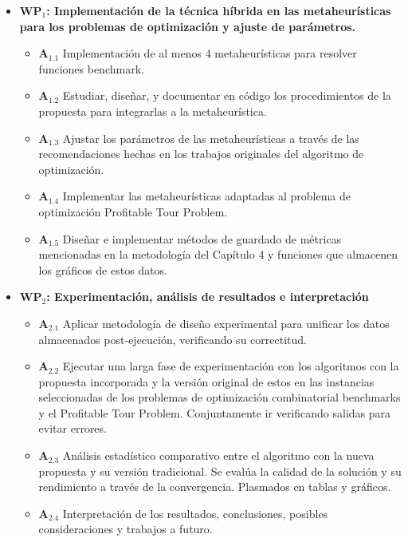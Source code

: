 \begin{itemize}

    \item \textbf{WP$_1$: Implementación de la técnica híbrida en las metaheurísticas para los problemas de optimización y ajuste de parámetros.}

    \begin{itemize}

        \item \textbf{A$_{1.1}$} Implementación de al menos 4 metaheurísticas para resolver funciones benchmark.

        \item \textbf{A$_{1.2}$} Estudiar, diseñar, y documentar en código los procedimientos de la propuesta para integrarlas a la metaheurística.

        \item \textbf{A$_{1.3}$} Ajustar los parámetros de las metaheurísticas a través de las recomendaciones hechas en los trabajos originales del algoritmo de optimización.

        \item \textbf{A$_{1.4}$} Implementar las metaheurísticas adaptadas al problema de optimización Profitable Tour Problem.

        \item \textbf{A$_{1.5}$} Diseñar e implementar métodos de guardado de métricas mencionadas en la metodología del Capítulo 4 y funciones que almacenen los gráficos de estos datos.

    \end{itemize}

    \item \textbf{WP$_2$: Experimentación, análisis de resultados e interpretación}

    \begin{itemize}

        \item \textbf{A$_{2.1}$} Aplicar metodología de diseño experimental para unificar los datos almacenados post-ejecución, verificando su correctitud.

        \item \textbf{A$_{2.2}$} Ejecutar una larga fase de experimentación con los algoritmos con la propuesta incorporada y la versión original de estos en las instancias seleccionadas de los problemas de optimización combinatorial benchmarks y el Profitable Tour Problem. Conjuntamente ir verificando salidas para evitar errores.

        \item \textbf{A$_{2.3}$} Análisis estadístico comparativo entre el algoritmo con la nueva propuesta y su versión tradicional. Se evalúa la calidad de la solución y su rendimiento a través de la convergencia. Plasmados en tablas y gráficos.

        \item \textbf{A$_{2.4}$} Interpretación de los resultados, conclusiones, posibles consideraciones y trabajos a futuro.

    \end{itemize}

\end{itemize}




